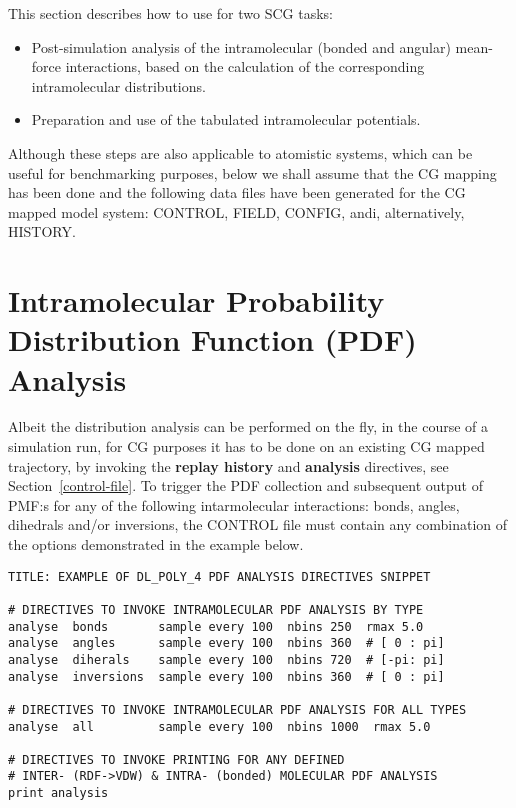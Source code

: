 This section describes how to use \D for two SCG tasks:

\begin{itemize}
\item Post-simulation analysis of the intramolecular (bonded and angular)
mean-force interactions, based on the calculation of the corresponding
intramolecular distributions.
\item Preparation and use of the tabulated intramolecular potentials.
\end{itemize}

 Although these steps are also applicable to
atomistic systems, which can be useful for benchmarking purposes,
below we shall assume that the CG mapping has been done and the following
data files have been generated for the CG mapped model system:
CONTROL, FIELD, CONFIG, andi, alternatively, HISTORY.

\section{Intramolecular Probability Distribution Function (PDF) Analysis}
\label{IPDF-analysis}

Albeit the distribution analysis can be performed on the fly,
in the course of a simulation run, for CG purposes it has
to be done on an existing CG mapped trajectory, by invoking
the {\bf replay history} and {\bf analysis} directives,
see Section~\ref{control-file}.
To trigger the PDF collection and subsequent output of PMF:s
for any of the following intarmolecular interactions: bonds,
angles, dihedrals and/or inversions, the CONTROL file must
contain any combination of the options demonstrated
in the example below.

\begin{verbatim}
TITLE: EXAMPLE OF DL_POLY_4 PDF ANALYSIS DIRECTIVES SNIPPET

# DIRECTIVES TO INVOKE INTRAMOLECULAR PDF ANALYSIS BY TYPE
analyse  bonds       sample every 100  nbins 250  rmax 5.0
analyse  angles      sample every 100  nbins 360  # [ 0 : pi]
analyse  diherals    sample every 100  nbins 720  # [-pi: pi]
analyse  inversions  sample every 100  nbins 360  # [ 0 : pi]

# DIRECTIVES TO INVOKE INTRAMOLECULAR PDF ANALYSIS FOR ALL TYPES
analyse  all         sample every 100  nbins 1000  rmax 5.0

# DIRECTIVES TO INVOKE PRINTING FOR ANY DEFINED
# INTER- (RDF->VDW) & INTRA- (bonded) MOLECULAR PDF ANALYSIS
print analysis
\end{verbatim}


